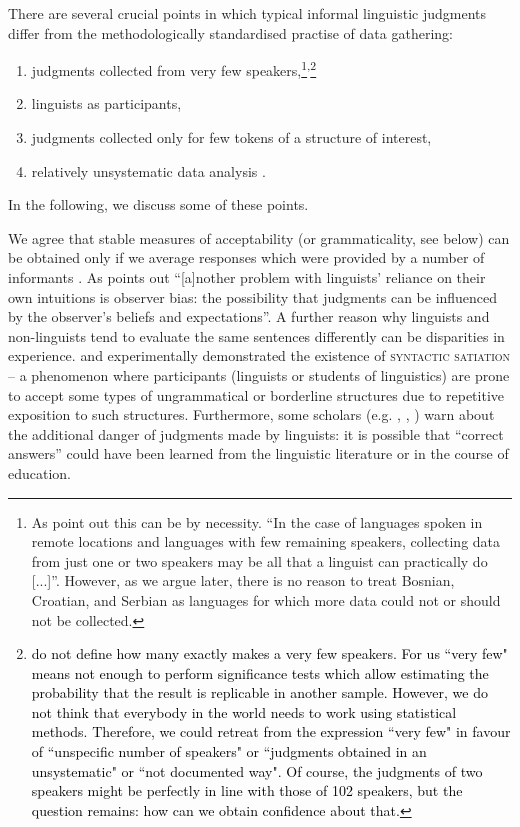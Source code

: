 There are several crucial points in which typical informal linguistic judgments differ from the methodologically standardised practise of data gathering: 
\newpage

\begin{enumerate}
	\item judgments collected from very few speakers,\footnote{As \citet[39]{SchutzeSprouse13} point out this can be by necessity. “In the case of languages spoken in remote locations and languages with few remaining speakers, collecting data from just one or two speakers may be all that a linguist can practically do [...]”. However, as we argue later, there is no reason to treat Bosnian, Croatian, and Serbian as languages for which more data could not or should not be collected.}\textsuperscript{,}\footnote{\textcolor{black}{\citet[]{SchutzeSprouse13} do not define how many exactly makes a very few speakers. For us ``very few" means not enough to perform significance tests which allow estimating the probability that the result is replicable in another sample. However, we do not think that everybody in the world needs to work using statistical methods. Therefore, we could retreat from the expression ``very few" in favour of ``unspecific number of speakers" or ``judgments obtained in an unsystematic" or ``not documented way". Of course, the judgments of two speakers might be perfectly in line with those of 102 speakers, but the question remains: how can we obtain confidence about that.}} 
	\item linguists as participants,
	\item judgments collected only for few tokens of a structure of interest,
	\item relatively unsystematic data analysis \citep[cf.][30]{SchutzeSprouse13}. 

\end{enumerate}
	In the following, we discuss some of these points.
	
We agree that stable measures of acceptability (or grammaticality, see below) can be obtained only if we average responses which were provided by a number of informants \citep[cf.][1f]{Dabrowska10}. As \citet[2]{Dabrowska10} points out ``[a]nother problem with linguists’ reliance on their own intuitions is observer bias: the possibility that judgments can be influenced by the observer’s beliefs and expectations''. A further reason why linguists and non-linguists tend to evaluate the same sentences differently can be disparities in experience. \citet{Hiramatsu99} and \citet{Snyder00} experimentally demonstrated the existence of \textsc{syntactic} \textsc{satiation} – a phenomenon where participants (linguists or students of linguistics) are prone to accept some types of ungrammatical or borderline structures due to repetitive exposition to such structures. Furthermore, some scholars (e.g. \citealt[47]{Schutze16}, \citealt[60]{Cowart97}, \citealt[575]{Snyder00}) warn about the additional danger of judgments made by linguists: it is possible that ``correct answers'' could have been learned from the linguistic literature or in the course of education.

